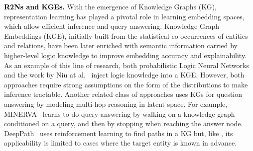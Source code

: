 \documentclass[journal]{IEEEtran}
\newcommand{\ar}[1]{\textcolor{black}{#1}}
\begin{document}
\ar{{\bf R2Ns and KGEs. }}
With the emergence of Knowledge Graphs (KG), representation learning has played a pivotal role in learning embedding spaces, which allow efficient inference and query answering.
Knowledge Graph Embeddings (KGE), initially built from the statistical co-occurrences of entities and relations, have been later enriched with semantic information carried by higher-level logic knowledge to improve embedding accuracy and explainability. As an example of this line of research, both probabilistic Logic Neural Networks~\cite{qu2019probabilistic} and the work by Niu at al.~\cite{niu2020rule} inject logic knowledge into a KGE. However, both approaches require strong assumptions on the form of the distributions to make inference tractable.
Another related class of approaches uses KGs for question answering by modeling multi-hop reasoning in latent space. For example, MINERVA~\cite{das2018gofor} learns to do query answering by walking on a knowledge graph conditioned on a query, and then by stopping when reaching the answer node. 
DeepPath~\cite{xiong2017deeppath} uses reinforcement learning to find paths in a KG but, like \cite{ren2020beta}, its applicability is limited to cases where the target entity is known in advance.
\end{document}
